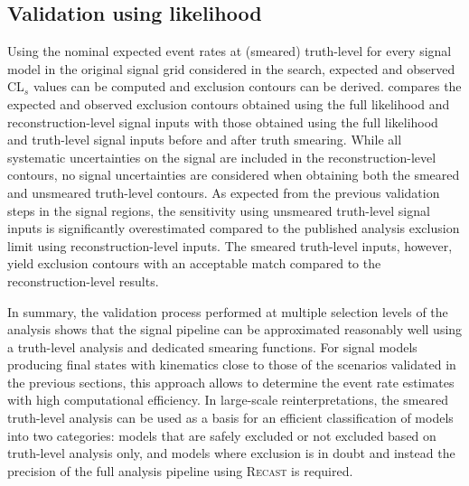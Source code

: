 \subsection{Validation using likelihood}

Using the nominal expected event rates at (smeared) truth-level for every signal model in the original signal grid considered in the \onelepton search, expected and observed CL$_s$ values can be computed and exclusion contours can be derived.
 compares the expected and observed exclusion contours obtained using the full likelihood and reconstruction-level signal inputs with those obtained using the full likelihood and truth-level signal inputs before and after truth smearing.
While all systematic uncertainties on the signal are included in the reconstruction-level contours, no signal uncertainties are considered when obtaining both the smeared and unsmeared truth-level contours.
As expected from the previous validation steps in the signal regions, the sensitivity using unsmeared truth-level signal inputs is significantly overestimated compared to the published analysis exclusion limit using reconstruction-level inputs.
The smeared truth-level inputs, however, yield exclusion contours with an acceptable match compared to the reconstruction-level results.

In summary, the validation process performed at multiple selection levels of the analysis shows that the signal pipeline can be approximated reasonably well using a truth-level analysis and dedicated smearing functions.
For signal models producing final states with kinematics close to those of the scenarios validated in the previous sections, this approach allows to determine the event rate estimates with high computational efficiency.
In large-scale reinterpretations, the smeared truth-level analysis can be used as a basis for an efficient classification of models into two categories: models that are safely excluded or not excluded based on truth-level analysis only, and models where exclusion is in doubt and instead the precision of the full analysis pipeline using \textsc{Recast} is required.


